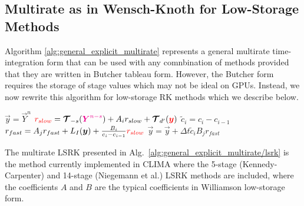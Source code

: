 \documentclass{report}
\begin{document}
\subsection{Multirate as in Wensch-Knoth for Low-Storage Methods}
Algorithm \ref{alg:general_explicit_multirate} represents a general multirate time-integration form that can be used with any comnbination of methods provided that they are written in Butcher tableau form.  However, the Butcher form requires the storage of stage values which may not be ideal on GPUs. Instead, we now rewrite this algorithm for low-storage RK methods which we describe below.
\begin{algorithm}
\label{alg:general_explicit_multirate/lsrk}
\begin{algorithmic}
\State
{}
\State $\vec{y}=\vec{Y}^n$ 
\State $\textcolor{red}{r_{slow}}=\boldsymbol{{\mathcal{T}}}_{-s}(\textcolor{magenta}{ \boldsymbol{{Y}}^{n-s}}) + A_i r_{slow} + \boldsymbol{{\mathcal{T}}}_{d'}(\textcolor{red}{\boldsymbol{{y}}})$
\State $\widetilde{c}_i=c_i - c_{i-1}$
\State $r_{fast}=A_j r_{fast} + L_I(\boldsymbol{{y}}) + \frac{B_i}{c_i - c_{i-1}} \textcolor{red}{r_{slow}}$ 
\State $\vec{y} = \vec{y} + \Delta t \widetilde{c}_i  B_j r_{fast}$
\EndFor %
\EndFor %
\EndFunction
\end{algorithmic}
\end{algorithm}
The multirate LSRK presented in Alg.\  \ref{alg:general_explicit_multirate/lsrk} is the method currently implemented in CLIMA where the 5-stage (Kennedy-Carpenter) and 14-stage (Niegemann et al.) LSRK methods are included, where the coefficients $A$ and $B$ are the typical coefficients in Williamson low-storage form.
\end{document}
